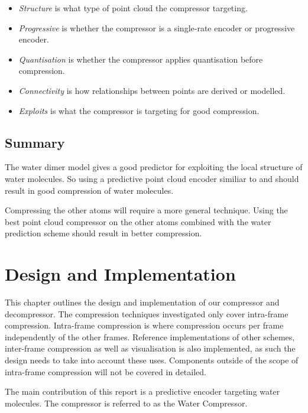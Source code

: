 \documentclass[a4paper]{report}
\begin{document}
\begin{itemize}
\item \emph{Structure} is what type of point cloud the compressor targeting.

\item \emph{Progressive} is whether the compressor is a single-rate encoder or
  progressive encoder.

\item \emph{Quantisation} is whether the compressor applies quantisation
  before compression.

\item \emph{Connectivity} is how relationships between points are derived or
  modelled.

\item \emph{Exploits} is what the compressor is targeting for good
  compression.
\end{itemize}


\section{Summary}

The water dimer model gives a good predictor for exploiting the local
structure of water molecules. So using a predictive point cloud encoder
similiar to \citep{merrycomp} and \citep{gumholdcomp} should result in good
compression of water molecules.

Compressing the other atoms will require a more general technique. Using the
best point cloud compressor on the other atoms combined with the water
prediction scheme should result in better compression.


\chapter{Design and Implementation}

This chapter outlines the design and implementation of our compressor and
decompressor. The compression techniques investigated only cover intra-frame
compression. Intra-frame compression is where compression occurs per frame
independently of the other frames. Reference implementations of other schemes,
inter-frame compression as well as visualisation is also implemented, as such
the design needs to take into account these uses. Components outside of the
scope of intra-frame compression will not be covered in detailed.

The main contribution of this report is a predictive encoder targeting water
molecules. The compressor is referred to as the Water Compressor.
\end{document}
